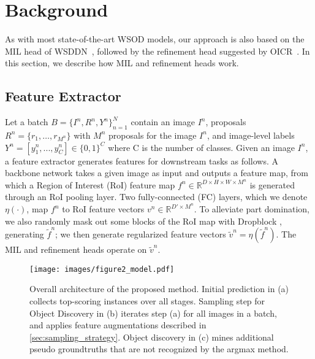 \documentclass[runningheads]{llncs}
\begin{document}
\section{Background}

\label{sec:preliminary}
As with most state-of-the-art WSOD models, our approach is also based on the MIL head of WSDDN~\cite{Bilen_2016_CVPR}, followed by the refinement head suggested by OICR~\cite{Tang_2017_CVPR}.
In this section, we describe how MIL and refinement heads work.

\subsection{Feature Extractor}
Let a batch $B=\{I^n, R^n, Y^n\}_{n=1}^{N}$ contain an image $I^n$, proposals $R^n=\{r_1,\dots, r_{M^n}\}$ with $M^n$ proposals for the image $I^n$, and image-level labels $Y^n=[y^{n}_1, ..., y^{n}_C]\in \{0, 1\}^{C}$ where C is the number of classes.
Given an image $I^n$, a feature extractor generates features for downstream tasks as follows.
A backbone network takes a given image as input and outputs a feature map, from which a Region of Interest (RoI) feature map $f^n \in \mathbb{R}^{D \times H \times W \times M^n}$ is generated through an RoI pooling layer.
Two fully-connected (FC) layers, which we denote $\eta(\cdot)$, map $f^n$ to RoI feature vectors $v^n  \in\mathbb{R}^{D'\times M^n}$.
To alleviate part domination, we also randomly mask out some blocks of the RoI map with Dropblock \cite{ren2020instance}, generating $\tilde f^n$;
we then generate regularized feature vectors $\tilde v^n = \eta(\tilde f^n)$.
The MIL and refinement heads operate on $\tilde{v}^n$.


\begin{figure*}[t!]
\centering
\texttt{[image: images/figure2\_model.pdf]}
\caption{Overall architecture of the proposed method. Initial prediction in (a) collects top-scoring instances over all stages. Sampling step for Object Discovery in (b) iterates step (a) for all images in a batch, and applies feature augmentations described in \cref{sec:sampling_strategy}.
Object discovery in (c) mines additional pseudo groundtruths that are not recognized by the argmax method.}
\label{fig:figure2_model}
\end{figure*}
\end{document}
